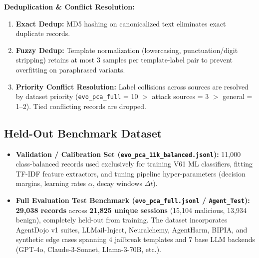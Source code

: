 \documentclass[conference]{IEEEtran}
\begin{document}
\textbf{Deduplication \& Conflict Resolution:}
\begin{enumerate}
    \item \textbf{Exact Dedup:} MD5 hashing on canonicalized text eliminates exact duplicate records.
    \item \textbf{Fuzzy Dedup:} Template normalization (lowercasing, punctuation/digit stripping) retains at most 3 samples per template-label pair to prevent overfitting on paraphrased variants.
    \item \textbf{Priority Conflict Resolution:} Label collisions across sources are resolved by dataset priority (\texttt{evo\_pca\_full} = 10 $>$ attack sources = 3 $>$ general = 1–2). Tied conflicting records are dropped.
\end{enumerate}

\subsection{Held-Out Benchmark Dataset}
\begin{itemize}
    \item \textbf{Validation / Calibration Set (\texttt{evo\_pca\_11k\_balanced.jsonl}):} 11,000 class-balanced records used exclusively for training V61 ML classifiers, fitting TF-IDF feature extractors, and tuning pipeline hyper-parameters (decision margins, learning rates $\alpha$, decay windows $\Delta t$).
    \item \textbf{Full Evaluation Test Benchmark (\texttt{evo\_pca\_full.jsonl} / \texttt{Agent\_Test}):} \textbf{29,038 records} across \textbf{21,825 unique sessions} (15,104 malicious, 13,934 benign), completely held-out from training. The dataset incorporates AgentDojo v1 suites, LLMail-Inject, Neuralchemy, AgentHarm, BIPIA, and synthetic edge cases spanning 4 jailbreak templates and 7 base LLM backends (GPT-4o, Claude-3-Sonnet, Llama-3-70B, etc.).
\end{itemize}
\end{document}
